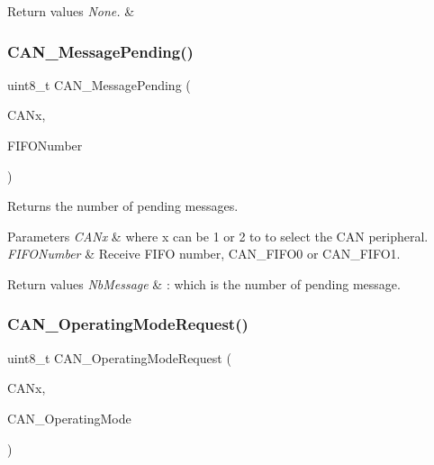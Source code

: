 \begin{DoxyRetVals}{Return values}
{\em None.} & \\
\hline
\end{DoxyRetVals}
\mbox{\label{group___c_a_n___exported___functions_ga7100459a95ce1b3cfe8ab15e112029fe}} 
\subsubsection{\texorpdfstring{CAN\_MessagePending()}{CAN\_MessagePending()}}
{\footnotesize\ttfamily uint8\+\_\+t C\+A\+N\+\_\+\+Message\+Pending (\begin{DoxyParamCaption}\item[{\mbox{\hyperlink{struct_c_a_n___type_def}{C\+A\+N\+\_\+\+Type\+Def}} $\ast$}]{C\+A\+Nx,  }\item[{uint8\+\_\+t}]{F\+I\+F\+O\+Number }\end{DoxyParamCaption})}



Returns the number of pending messages. 


\begin{DoxyParams}{Parameters}
{\em C\+A\+Nx} & where x can be 1 or 2 to to select the C\+AN peripheral. \\
\hline
{\em F\+I\+F\+O\+Number} & Receive F\+I\+FO number, C\+A\+N\+\_\+\+F\+I\+F\+O0 or C\+A\+N\+\_\+\+F\+I\+F\+O1. \\
\hline
\end{DoxyParams}

\begin{DoxyRetVals}{Return values}
{\em Nb\+Message} & \+: which is the number of pending message. \\
\hline
\end{DoxyRetVals}
\mbox{\label{group___c_a_n___exported___functions_gab2a3630e9e3024114eb117d14e514208}} 
\subsubsection{\texorpdfstring{CAN\_OperatingModeRequest()}{CAN\_OperatingModeRequest()}}
{\footnotesize\ttfamily uint8\+\_\+t C\+A\+N\+\_\+\+Operating\+Mode\+Request (\begin{DoxyParamCaption}\item[{\mbox{\hyperlink{struct_c_a_n___type_def}{C\+A\+N\+\_\+\+Type\+Def}} $\ast$}]{C\+A\+Nx,  }\item[{uint8\+\_\+t}]{C\+A\+N\+\_\+\+Operating\+Mode }\end{DoxyParamCaption})}



